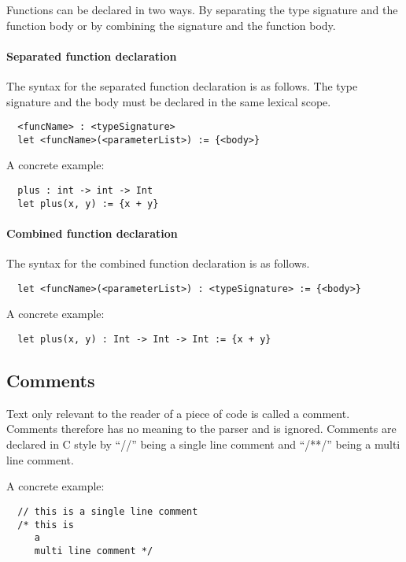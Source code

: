 Functions can be declared in two ways. By separating the type signature and the function body or by combining the signature and the function body.

\paragraph{Separated function declaration}

The syntax for the separated function declaration is as follows. The type signature and the body must be declared in the same lexical scope.

\begin{verbatim}
  <funcName> : <typeSignature>
  let <funcName>(<parameterList>) := {<body>}
\end{verbatim}

A concrete example:

\begin{verbatim}
  plus : int -> int -> Int
  let plus(x, y) := {x + y}
\end{verbatim}


\paragraph{Combined function declaration}

The syntax for the combined function declaration is as follows.

\begin{verbatim}
  let <funcName>(<parameterList>) : <typeSignature> := {<body>}
\end{verbatim}

A concrete example:

\begin{verbatim}
  let plus(x, y) : Int -> Int -> Int := {x + y}
\end{verbatim}

\subsection{Comments}
\label{sec:comments}

Text only relevant to the reader of a piece of code is called a comment. Comments therefore has no meaning to the parser and is ignored. Comments are declared in C style by \enquote{//} being a single line comment and \enquote{/**/} being a multi line comment.

A concrete example:

\begin{verbatim}
  // this is a single line comment
  /* this is
     a
     multi line comment */
\end{verbatim}

